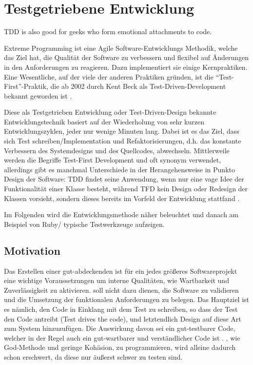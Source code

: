 \chapter{Testgetriebene Entwicklung}
\label{sec:tdd}

\epigraph{TDD is also good for geeks who form emotional attachments to code. }{\cite{beck_test_2002}}Extreme Programming ist eine Agile Software-Entwicklungs Methodik, welche das Ziel hat, die Qualität der Software zu verbessern und flexibel auf Änderungen in den Anforderungen zu reagieren. Dazu implementiert sie einige Kernpraktiken. Eine Wesentliche, auf der viele der anderen Praktiken gründen, ist die "`Test-First"'-Praktik, die ab 2002 durch Kent Beck als Test-Driven-Development bekannt geworden ist \citep{beck_test_2002}.

Diese als Testgetrieben Entwicklung oder Test-Driven-Design bekannte Entwicklungstechnik basiert auf der Wiederholung von sehr kurzen Entwicklungszyklen, jeder nur wenige Minuten lang. Dabei ist es das Ziel, dass sich Test schreiben/Implementation und Refaktorisierungen, d.h. das konstante Verbessern des Systemdesigns und des Quellcodes, abwechseln. Mittlerweile werden die Begriffe Test-First Development und  oft synonym verwendet, allerdings gibt es manchmal Unterschiede in der Herangehensweise in Punkto Design der Software: TDD findet seine Anwendung, wenn nur eine vage Idee der Funktionalität einer Klasse besteht, während TFD kein Design oder Redesign der Klassen vorsieht, sondern dieses bereits im Vorfeld der Entwicklung stattfand \citep{stackoverflow_testing_2008}.

Im Folgenden wird die Entwicklungsmethode  näher beleuchtet und danach am Beispiel von Ruby/ typische Testwerkzeuge aufzeigen.

\section{Motivation}
Das Erstellen einer gut-abdeckenden  ist für ein jedes größeres Softwareprojekt eine wichtige Voraussetzungen um interne Qualitäten, wie Wartbarkeit und Zuverlässigkeit zu aktivieren.  soll nicht dazu dienen, die Software zu validieren und die Umsetzung der funktionalen Anforderungen zu belegen. Das Hauptziel ist es nämlich, den Code in Einklang mit dem Test zu schreiben, so dass der Test den Code antreibt (Test drives the code), und letztendlich Design auf diese Art zum System hinzuzufügen. Die Auswirkung davon sei ein gut-testbarer Code, welcher in der Regel auch ein gut-wartbarer und verständlicher Code ist \citep{beck_test_2002}. , wie God-Methode und geringe Kohäsion, zu programmieren, wird alleine dadurch schon erschwert, da diese nur äußerst schwer zu testen sind.

